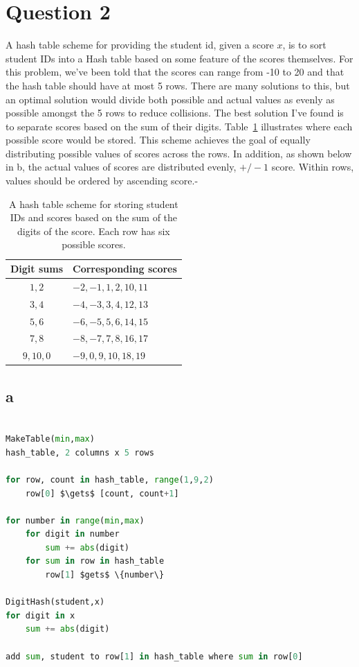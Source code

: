 \documentclass[12pt]{article}
\begin{document}
\section*{Question 2}
A hash table scheme for providing the student id, given a score $x$, is to sort student IDs into a Hash table based on some feature of the scores themselves.  For this problem, we've been told that the scores can range from -10 to 20 and that the hash table should have at most 5 rows.  There are many solutions to this, but an optimal solution would divide both possible and actual values as evenly as possible amongst the 5 rows to reduce collisions.  The best solution I've found is to separate scores based on the sum of their digits.  Table~\ref{hashintro} illustrates where each possible score would be stored.  This scheme achieves the goal of equally distributing possible values of scores across the rows.  In addition, as shown below in b, the actual values of scores are distributed evenly, $+/- 1$ score.  Within rows, values should be ordered by ascending score.-

\begin{table}[h]
\begin{tabular}{c|l}
Digit sums & Corresponding scores\\\hline
$1, 2$ & $-2,-1,1,2,10,11$\\
$3,4$ & $-4,-3,3,4,12,13$\\
$5,6$ & $-6,-5,5,6,14,15$\\
$7,8$ & $-8,-7,7,8,16,17$\\
$9,10,0$ & $-9,0,9,10,18,19$\\
\end{tabular}
\caption{A hash table scheme for storing student IDs and scores based on the sum of the digits of the score.  Each row has six possible scores.}
\label{hashintro}
\end{table}


\subsection*{a} %
\begin{lstlisting}[language=python, mathescape=true]

MakeTable(min,max)
hash_table, 2 columns x 5 rows

for row, count in hash_table, range(1,9,2)
	row[0] $\gets$ [count, count+1]

for number in range(min,max)
	for digit in number
		sum += abs(digit)
	for sum in row in hash_table
		row[1] $gets$ \{number\}
	
DigitHash(student,x)
for digit in x
	sum += abs(digit)

add sum, student to row[1] in hash_table where sum in row[0]

\end{lstlisting}
\end{document}
